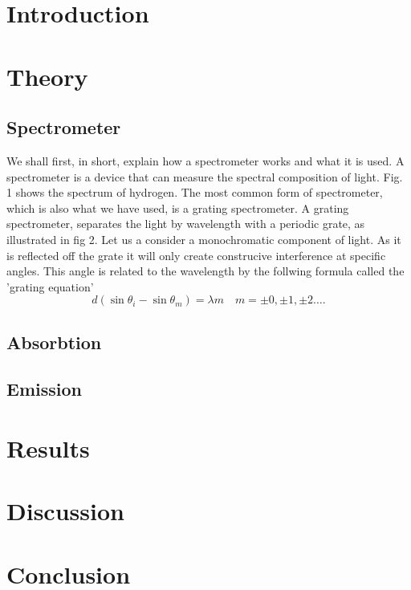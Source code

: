 \documentclass[working, oneside]{inputs/tuftebook}
\begin{document}
% 
\section*{Introduction}
\section*{Theory}
\subsection*{Spectrometer}
We shall first, in short, explain how a spectrometer works and what it is used. A spectrometer is a device that can measure the spectral composition of light. Fig. 1 shows the spectrum of hydrogen. The most common form of spectrometer, which is also what we have used, is a grating spectrometer. A grating spectrometer, separates the light by wavelength with a periodic grate, as illustrated in fig 2. Let us a consider a monochromatic component of light. As it is reflected off the grate it will only create construcive interference at specific angles. This angle is related to the wavelength by the follwing formula called the 'grating equation'
\[
d\left( \sin \theta_i - \sin \theta_m \right) = \lambda m \quad m = \pm 0, \pm 1, \pm 2 \ldots
.\] 
\subsection*{Absorbtion}
\subsection*{Emission}
\section*{Results}
\section*{Discussion}
\section*{Conclusion}
\end{document}
